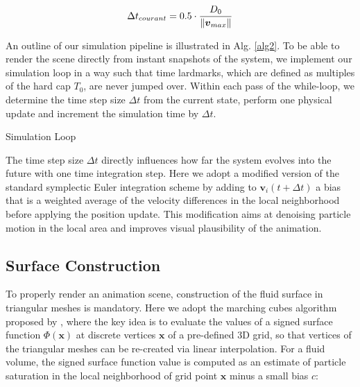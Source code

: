 \documentclass[
	11pt, 
	DIV10,
	ngerman,
	a4paper, 
	oneside, 
	headings=normal, 
	captions=tableheading,
	final, 
	numbers=noenddot
]{scrartcl}
\DeclarePairedDelimiter{\norm}{\lVert}{\rVert}
\begin{document}
\begin{equation}
	\label{eq16}
	\Delta t_{courant} = 0.5 \cdot \frac{D_{0}}{\norm{\boldsymbol{v}_{max}}}
\end{equation}

An outline of our simulation pipeline is illustrated in Alg. \ref{alg2}. To be able to render the scene directly from instant snapshots of the system, we implement our simulation loop in a way such that time lardmarks, which are defined as multiples of the hard cap $ T_{0} $, are never jumped over. Within each pass of the while-loop, we determine the time step size $ \Delta t $ from the current state, perform one physical update and increment the simulation time by $ \Delta t $.

\medskip
\begin{algorithm}[H]
	\SetAlgoLined
	\caption{\label{alg2} Simulation Loop}
\end{algorithm}
\medskip

The time step size $ \Delta t $ directly influences how far the system evolves into the future with one time integration step. Here we adopt a modified version of the standard symplectic Euler integration scheme by adding to $ \mathbf{v}_{i}(t + \Delta t) $ a bias that is a weighted average of the velocity differences in the local neighborhood before applying the position update. This modification aims at denoising particle motion in the local area and improves visual plausibility of the animation.

\subsection{Surface Construction}

To properly render an animation scene, construction of the fluid surface in triangular meshes is mandatory. Here we adopt the marching cubes algorithm proposed by \cite{lorensen1987marching}, where the key idea is to evaluate the values of a signed surface function $ \Phi(\mathbf{x}) $ at discrete vertices $ \mathbf{x} $ of a pre-defined 3D grid, so that vertices of the triangular meshes can be re-created via linear interpolation. For a fluid volume, the signed surface function value is computed as an estimate of particle saturation in the local neighborhood of grid point $ \mathbf{x} $ minus a small bias $ c $:
\end{document}
